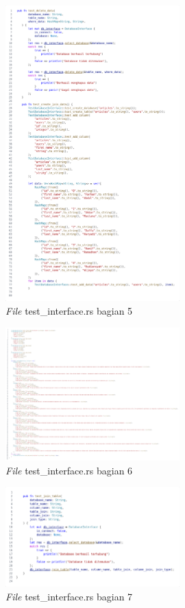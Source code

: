 \begin{figure}[H]
  \centering{}
	\includegraphics[width=0.6\textwidth]{gambar/lampiran/file-test-database-interface-5.png}
  \caption{\emph{File} test\_interface.rs bagian 5}
\end{figure}

\begin{figure}[H]
  \centering{}
	\includegraphics[width=0.6\textwidth]{gambar/lampiran/file-test-database-interface-6.png}
  \caption{\emph{File} test\_interface.rs bagian 6}
\end{figure}

\begin{figure}[H]
  \centering{}
	\includegraphics[width=0.6\textwidth]{gambar/lampiran/file-test-database-interface-7.png}
  \caption{\emph{File} test\_interface.rs bagian 7}
\end{figure}

